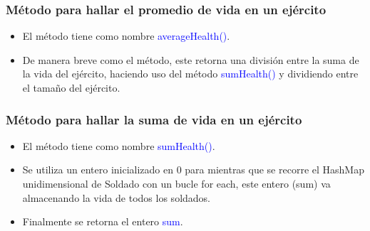 \documentclass{article}
\begin{document}
\subsubsection{Método para hallar el promedio de vida en un ejército}
\begin{itemize}
    \item El método tiene como nombre \textcolor{blue}{averageHealth()}.
    \item De manera breve como el método, este retorna una división entre la suma de la vida del ejército, haciendo uso del método \textcolor{blue}{sumHealth()} y dividiendo entre el tamaño del ejército.
\end{itemize}



\subsubsection{Método para hallar la suma de vida en un ejército}
\begin{itemize} f
    \item El método tiene como nombre \textcolor{blue}{sumHealth()}.
    \item Se utiliza un entero inicializado en 0 para mientras que se recorre el HashMap unidimensional de Soldado con un bucle for each, este entero (sum) va almacenando la vida de todos los soldados.
    \item Finalmente se retorna el entero \textcolor{blue}{sum}.
\end{itemize}

\end{document}
